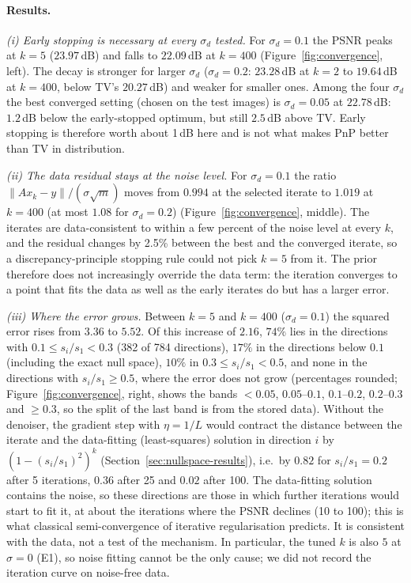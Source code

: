\paragraph{Results.}
\emph{(i) Early stopping is necessary at every $\sigma_d$ tested.} For $\sigma_d=0.1$ the PSNR peaks at $k=5$ ($23.97$\,dB) and falls to $22.09$\,dB at $k=400$ (Figure~\ref{fig:convergence}, left). The decay is stronger for larger $\sigma_d$ ($\sigma_d=0.2$: $23.28$\,dB at $k=2$ to $19.64$\,dB at $k=400$, below TV's $20.27$\,dB) and weaker for smaller ones. Among the four $\sigma_d$ the best converged
setting (chosen on the test images) is $\sigma_d=0.05$ at $22.78$\,dB: $1.2$\,dB below the early-stopped optimum, but still $2.5$\,dB above TV. Early stopping is therefore worth about 1\,dB here and is not what makes PnP better than TV in distribution.

\emph{(ii) The data residual stays at the noise level.} For $\sigma_d=0.1$ the ratio $\lVert Ax_k-y\rVert/(\sigma\sqrt m)$ moves from $0.994$ at the selected iterate to $1.019$ at $k=400$ (at most $1.08$ for $\sigma_d=0.2$) (Figure~\ref{fig:convergence}, middle). The iterates are
data-consistent to within a few percent of the noise level at every $k$, and the residual changes by 2.5\% between the best and the converged iterate, so a discrepancy-principle stopping rule could not pick $k=5$ from it. The prior therefore does not increasingly override the data term: the iteration converges to a point that fits the data as well as the early iterates do but has a larger error.

\emph{(iii) Where the error grows.} Between $k=5$ and $k=400$ ($\sigma_d=0.1$) the squared error rises from $3.36$ to $5.52$. Of this increase of $2.16$, $74\%$ lies in the directions with $0.1\le s_i/s_1<0.3$ (382 of 784 directions), $17\%$ in the directions below $0.1$ (including the exact null space), $10\%$ in $0.3\le s_i/s_1<0.5$, and none in the directions with $s_i/s_1\ge0.5$, where the error does not
grow (percentages rounded; Figure~\ref{fig:convergence}, right, shows the bands $<0.05$, $0.05$--$0.1$, $0.1$--$0.2$, $0.2$--$0.3$ and $\ge0.3$, so the split of the last band is from the stored data). Without the denoiser, the gradient step with $\eta=1/L$ would contract the distance between the iterate and the data-fitting (least-squares) solution in direction $i$ by $(1-(s_i/s_1)^2)^k$ (Section~\ref{sec:nullspace-results}),
i.e.\ by $0.82$ for $s_i/s_1=0.2$ after 5 iterations, $0.36$ after 25 and $0.02$ after 100. The data-fitting solution contains the noise, so these directions are those in which further iterations would start to fit it, at about the iterations where the PSNR declines (10 to 100); this is what classical semi-convergence of iterative regularisation predicts. It is consistent with the data, not a test of the mechanism. In particular, the tuned $k$ is also $5$ at $\sigma=0$ (E1), so noise fitting cannot be the only cause; we did not record the iteration curve on noise-free data.

